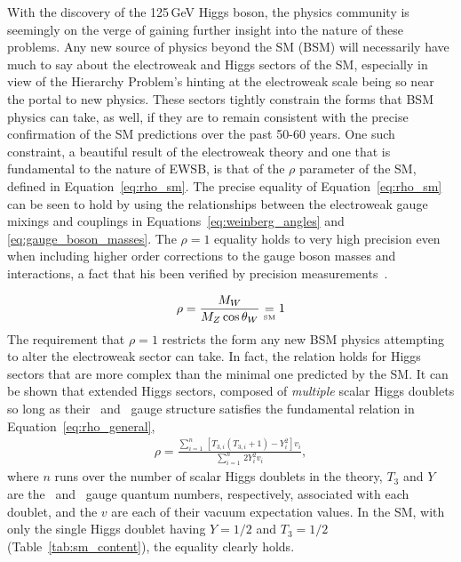 With the discovery of the 125\,GeV Higgs boson, the physics community is seemingly
on the verge of gaining further insight into the nature of these problems.
Any new source of physics beyond the SM (BSM) will necessarily have much to say
about the electroweak and Higgs sectors of the SM,
especially in view of the Hierarchy Problem's hinting at the electroweak scale
being so near the portal to new physics.
These sectors tightly constrain the forms that BSM physics can take, as well, if they
are to remain consistent with the precise confirmation of the SM predictions
over the past 50-60 years.
One such constraint, a beautiful result of the electroweak theory and one that
is fundamental to the nature of EWSB, is that of the $\rho$ parameter of the SM,
defined in Equation~\ref{eq:rho_sm}.
The precise equality of Equation~\ref{eq:rho_sm} can be seen to hold by using the relationships
between the electroweak gauge mixings and couplings in Equations~\ref{eq:weinberg_angles} and \ref{eq:gauge_boson_masses}.
The $\rho = 1$ equality holds to very high precision even when including higher order
corrections to the gauge boson masses and interactions, a fact that his been verified
by precision measurements~\cite{EWSBProbeRho,PDGRef}.

\begin{align}
    \rho = \frac{
                M_W
            }
            {
                M_Z \cos \theta_W
            }
        \underset{\text{\tiny{SM}}}{=} 1
    \label{eq:rho_sm}
\end{align}
The requirement that $\rho = 1$ restricts the form any new BSM physics attempting to alter
the electroweak sector can take.
In fact, the relation holds for Higgs sectors that are more complex than the minimal one
predicted by the SM.
It can be shown that extended Higgs sectors, composed of \textit{multiple} scalar Higgs doublets
so long as their \SUtwo~and \Uone~gauge structure satisfies the fundamental relation in Equation~\ref{eq:rho_general},
\begin{align}
    \rho = \frac{
                \sum\limits_{i = 1}^n \, \left[ T_{3,i} \left( T_{3,i} + 1 \right) - Y_i^2 \right ] v_i
            }
            {
                \sum\limits_{i=1}^n \, 2 Y_i^2 v_i
            },
    \label{eq:rho_general}
\end{align}
where $n$ runs over the number of scalar Higgs doublets in the theory, $T_{3}$ and $Y$ are the \SUtwo~and \Uone~gauge
quantum numbers, respectively, associated with each doublet, and the $v$ are each of their vacuum expectation values.
In the SM, with only the single Higgs doublet having $Y = 1/2$ and $T_3 = 1/2$ (Table~\ref{tab:sm_content}),
the equality clearly holds.

